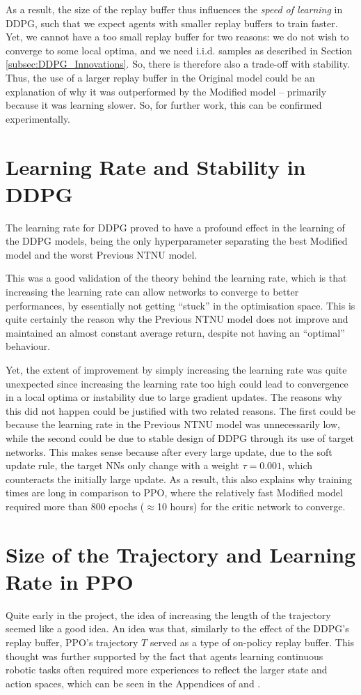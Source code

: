 As a result, the size of the replay buffer thus influences the \textit{speed of learning} in DDPG, such that we expect agents with smaller replay buffers to train faster. Yet, we cannot have a too small replay buffer for two reasons: we do not wish to converge to some local optima, and we need i.i.d. samples as described in Section \ref{subsec:DDPG_Innovations}. So, there is therefore also a trade-off with stability.
Thus, the use of a larger replay buffer in the Original model could be an explanation of why it was outperformed by the Modified model -- primarily because it was learning slower. So, for further work, this can be confirmed experimentally.

\section{Learning Rate and Stability in DDPG}
\label{sec:6_learningrate_DDPG}
The learning rate for DDPG proved to have a profound effect in the learning of the DDPG models, being the only hyperparameter separating the best Modified model and the worst Previous NTNU model.

This was a good validation of the theory behind the learning rate, which is that increasing the learning rate can allow networks to converge to better performances, by essentially not getting ``stuck'' in the optimisation space. This is quite certainly the reason why the Previous NTNU model does not improve and maintained an almost constant average return, despite not having an ``optimal'' behaviour.

Yet, the extent of improvement by simply increasing the learning rate was quite unexpected since increasing the learning rate too high could lead to convergence in a local optima or instability due to large gradient updates. The reasons why this did not happen could be justified with two related reasons. The first could be because the learning rate in the Previous NTNU model was unnecessarily low, while the second could be due to stable design of DDPG through its use of target networks. This makes sense because after every large update, due to the soft update rule, the target NNs only change with a weight $\tau = 0.001$, which counteracts the initially large update. As a result, this also explains why training times are long in comparison to PPO, where the relatively fast Modified model required more than 800 epochs ($\approx$10 hours) for the critic network to converge.

\section{Size of the Trajectory and Learning Rate in PPO}
\label{sec:6_sizeof_trajectory}
Quite early in the project, the idea of increasing the length of the trajectory seemed like a good idea. An idea was that, similarly to the effect of the DDPG's replay buffer, PPO's trajectory $T$ served as a type of on-policy replay buffer. This thought was further supported by the fact that agents learning continuous robotic tasks often required more experiences to reflect the larger state and action spaces, which can be seen in the Appendices of \cite{PPO} and \cite{ppoOnDota2020}. 

